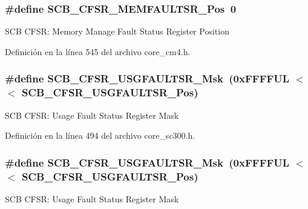 \subsubsection[{\texorpdfstring{S\+C\+B\+\_\+\+C\+F\+S\+R\+\_\+\+M\+E\+M\+F\+A\+U\+L\+T\+S\+R\+\_\+\+Pos}{SCB_CFSR_MEMFAULTSR_Pos}}]{\setlength{\rightskip}{0pt plus 5cm}\#define S\+C\+B\+\_\+\+C\+F\+S\+R\+\_\+\+M\+E\+M\+F\+A\+U\+L\+T\+S\+R\+\_\+\+Pos~0}\hypertarget{group___c_m_s_i_s___s_c_b_ga91f41491cec5b5acca3fbc94efbd799e}{}\label{group___c_m_s_i_s___s_c_b_ga91f41491cec5b5acca3fbc94efbd799e}
S\+CB C\+F\+SR\+: Memory Manage Fault Status Register Position 

Definición en la línea 545 del archivo core\+\_\+cm4.\+h.

\subsubsection[{\texorpdfstring{S\+C\+B\+\_\+\+C\+F\+S\+R\+\_\+\+U\+S\+G\+F\+A\+U\+L\+T\+S\+R\+\_\+\+Msk}{SCB_CFSR_USGFAULTSR_Msk}}]{\setlength{\rightskip}{0pt plus 5cm}\#define S\+C\+B\+\_\+\+C\+F\+S\+R\+\_\+\+U\+S\+G\+F\+A\+U\+L\+T\+S\+R\+\_\+\+Msk~(0x\+F\+F\+F\+F\+U\+L $<$$<$ S\+C\+B\+\_\+\+C\+F\+S\+R\+\_\+\+U\+S\+G\+F\+A\+U\+L\+T\+S\+R\+\_\+\+Pos)}\hypertarget{group___c_m_s_i_s___s_c_b_ga565807b1a3f31891f1f967d0fa30d03f}{}\label{group___c_m_s_i_s___s_c_b_ga565807b1a3f31891f1f967d0fa30d03f}
S\+CB C\+F\+SR\+: Usage Fault Status Register Mask 

Definición en la línea 494 del archivo core\+\_\+sc300.\+h.

\subsubsection[{\texorpdfstring{S\+C\+B\+\_\+\+C\+F\+S\+R\+\_\+\+U\+S\+G\+F\+A\+U\+L\+T\+S\+R\+\_\+\+Msk}{SCB_CFSR_USGFAULTSR_Msk}}]{\setlength{\rightskip}{0pt plus 5cm}\#define S\+C\+B\+\_\+\+C\+F\+S\+R\+\_\+\+U\+S\+G\+F\+A\+U\+L\+T\+S\+R\+\_\+\+Msk~(0x\+F\+F\+F\+F\+U\+L $<$$<$ S\+C\+B\+\_\+\+C\+F\+S\+R\+\_\+\+U\+S\+G\+F\+A\+U\+L\+T\+S\+R\+\_\+\+Pos)}\hypertarget{group___c_m_s_i_s___s_c_b_ga565807b1a3f31891f1f967d0fa30d03f}{}\label{group___c_m_s_i_s___s_c_b_ga565807b1a3f31891f1f967d0fa30d03f}
S\+CB C\+F\+SR\+: Usage Fault Status Register Mask 

